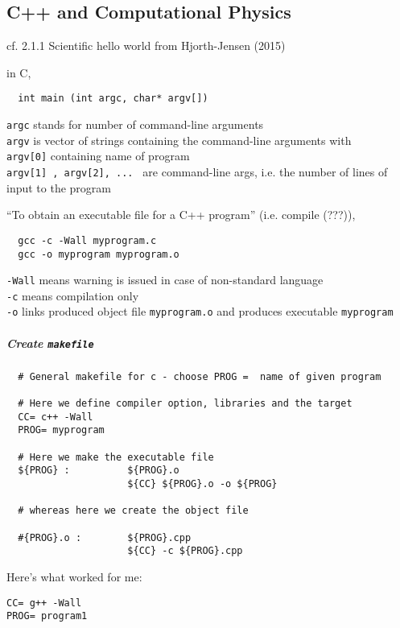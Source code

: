 \documentclass[10pt]{amsart}
\begin{document}
\begin{multicols*}{2}
\part{C++ and Computational Physics}

cf. 2.1.1 Scientific hello world from Hjorth-Jensen (2015) \cite{Hjor2015}

in C, 
\begin{lstlisting}
  int main (int argc, char* argv[])
\end{lstlisting}
\verb|argc| stands for number of command-line arguments \\
\verb|argv| is vector of strings containing the command-line arguments with \\
\phantom{argv} \verb|argv[0]| containing name of program \\
\phantom{argv} \verb|argv[1] , argv[2], ... | are command-line args, i.e. the number of lines of input to the program

``To obtain an executable file for a C++ program'' (i.e. compile (???)), 
\begin{lstlisting}
  gcc -c -Wall myprogram.c
  gcc -o myprogram myprogram.o
\end{lstlisting}
\verb|-Wall| means warning is issued in case of non-standard language \\
\verb|-c| means compilation only \\
\verb|-o| links produced object file \verb|myprogram.o| and produces executable \verb|myprogram|

\subsubsection{Create \verb|makefile|}

\begin{lstlisting}
  # General makefile for c - choose PROG =  name of given program
  
  # Here we define compiler option, libraries and the target
  CC= c++ -Wall
  PROG= myprogram

  # Here we make the executable file
  ${PROG} :          ${PROG}.o
                     ${CC} ${PROG}.o -o ${PROG}

  # whereas here we create the object file

  #{PROG}.o :        ${PROG}.cpp
                     ${CC} -c ${PROG}.cpp
\end{lstlisting}

Here's what worked for me:
\begin{lstlisting}
CC= g++ -Wall
PROG= program1


\end{lstlisting}
\end{multicols*}
\end{document}

